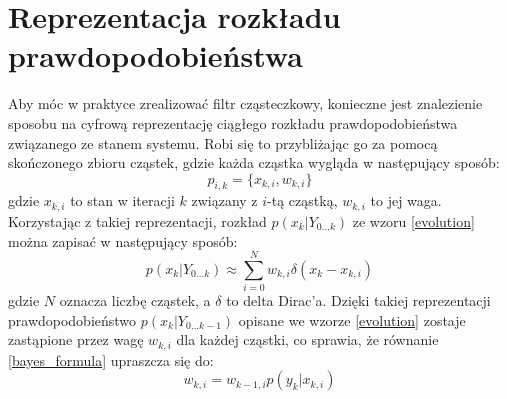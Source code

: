 \section{Reprezentacja rozkładu prawdopodobieństwa}
Aby móc w praktyce zrealizować filtr cząsteczkowy, konieczne jest znalezienie sposobu na cyfrową reprezentację ciągłego rozkładu prawdopodobieństwa związanego ze stanem systemu. Robi się to przybliżając go za pomocą skończonego zbioru cząstek, gdzie każda cząstka wygląda w następujący sposób:
\begin{equation*}
	p_{i,k}=\{x_{k,i},w_{k,i}\}
\end{equation*}
gdzie $x_{k,i}$ to stan w iteracji $k$ związany z $i$-tą cząstką, $w_{k,i}$ to jej waga. Korzystając z takiej reprezentacji, rozkład $p(x_k|Y_{0...k})$ ze wzoru \ref{evolution} można zapisać w następujący sposób:
\begin{equation}
	p(x_k|Y_{0...k})\approx \sum_{i=0}^{N} w_{k,i}	\delta(x_k-x_{k,i})
\end{equation}
gdzie $N$ oznacza liczbę cząstek, a $\delta$ to delta Dirac'a. Dzięki takiej reprezentacji prawdopodobieństwo $p(x_k|Y_{0...k-1})$ opisane we wzorze \ref{evolution} zostaje zastąpione przez wagę $w_{k,i}$ dla każdej cząstki, co sprawia, że równanie \ref{bayes_formula} upraszcza się do:
\begin{equation}\label{weight_update}
	w_{k,i} = w_{k-1,i} p(y_k|x_{k,i})
\end{equation}


